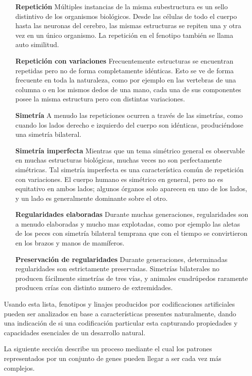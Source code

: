 \begin{itemize}
\item[\textbf{Repetición }] Múltiples instancias de la misma subestructura es un sello distintivo de los organismos biológicos. Desde las células de todo el cuerpo hasta las neuronas del cerebro, las mismas estructuras se repiten una y otra vez en un único organismo. La repetición en el fenotipo también se llama auto similitud.
\item[\textbf{Repetición con variaciones }] Frecuentemente estructuras se encuentran repetidas pero no de forma completamente idénticas. Esto se ve de forma frecuente en toda la naturaleza, como por ejemplo en las vertebras de una columna o en los mismos dedos de una mano, cada una de sus componentes posee la misma estructura pero con distintas variaciones.
\item[\textbf{Simetría }] A menudo las repeticiones ocurren a través de las simetrías, como cuando los lados derecho e izquierdo del cuerpo son idénticas, produciéndose una simetría bilateral.
\item[\textbf{Simetría imperfecta }] Mientras que un tema simétrico general es observable en muchas estructuras biológicas, muchas veces no son perfectamente simétricas. Tal simetría imperfecta es una característica común de repetición con variaciones. El cuerpo humano es simétrico en general, pero no es equitativo en ambos lados; algunos órganos solo aparecen en uno de los lados, y un lado es generalmente dominante sobre el otro.
\item[\textbf{Regularidades elaboradas }] Durante muchas generaciones, regularidades son a menudo elaboradas y mucho mas explotadas, como por ejemplo las aletas de los peces con simetría bilateral temprana que con el tiempo se convirtieron en los brazos y manos de mamíferos.
\item[\textbf{Preservación de regularidades }] Durante generaciones, determinadas regularidades son estrictamente preservadas. Simetrías bilaterales no producen fácilmente simetrías de tres vías, y animales cuadrúpedos raramente producen crías con distinto numero de extremidades.
\end{itemize}

Usando esta lista, fenotipos y linajes producidos por codificaciones artificiales pueden ser analizados en base a características presentes naturalmente, dando una indicación de si una codificación particular esta capturando propiedades y capacidades esenciales de un desarrollo natural.

La siguiente sección describe un proceso mediante el cual los patrones representados por un conjunto de genes pueden llegar a ser cada vez más complejos.

